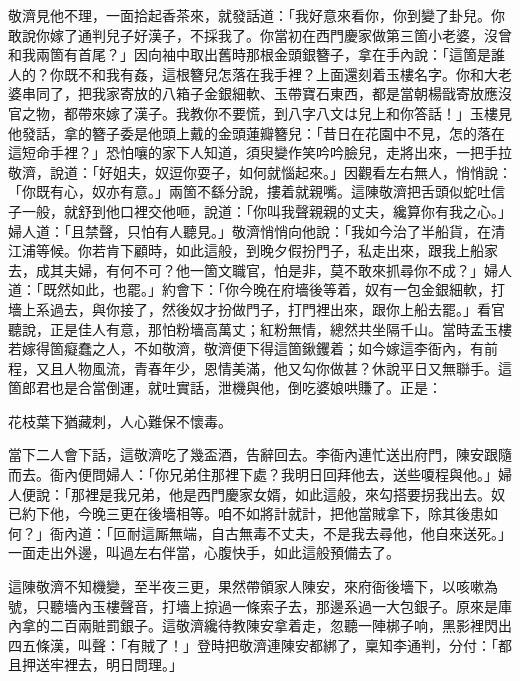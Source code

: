敬濟見他不理，一面拾起香茶來，就發話道：「我好意來看你，你到變了卦兒。你敢說你嫁了通判兒子好漢子，不採我了。你當初在西門慶家做第三箇小老婆，沒曾和我兩箇有首尾？」因向袖中取出舊時那根金頭銀簪子，拿在手內說：「這箇是誰人的？你既不和我有姦，這根簪兒怎落在我手裡？上面還刻着玉樓名字。你和大老婆串同了，把我家寄放的八箱子金銀細軟、玉帶寶石東西，都是當朝楊戩寄放應沒官之物，都帶來嫁了漢子。我教你不要慌，到八字八文は兒上和你答話！」玉樓見他發話，拿的簪子委是他頭上戴的金頭蓮瓣簪兒：「昔日在花園中不見，怎的落在這短命手裡？」恐怕嚷的家下人知道，須臾變作笑吟吟臉兒，走將出來，一把手拉敬濟，說道：「好姐夫，奴逗你耍子，如何就惱起來。」因觀看左右無人，悄悄說：「你既有心，奴亦有意。」{}兩箇不繇分說，摟着就親嘴。這陳敬濟把舌頭似蛇吐信子一般，就舒到他口裡交他咂，說道：「你叫我聲親親的丈夫，纔算你有我之心。」婦人道：「且禁聲，只怕有人聽見。」敬濟悄悄向他說：「我如今治了半船貨，在清江浦等候。你若肯下顧時，如此這般，到晚夕假扮門子，私走出來，跟我上船家去，成其夫婦，有何不可？他一箇文職官，怕是非，莫不敢來抓尋你不成？」{}婦人道：「既然如此，也罷。」約會下：「你今晚在府墻後等着，奴有一包金銀細軟，打墻上系過去，與你接了，然後奴才扮做門子，打門裡出來，跟你上船去罷。」看官聽說，正是佳人有意，那怕粉墻高萬丈；紅粉無情，總然共坐隔千山。當時孟玉樓若嫁得箇癡蠢之人，不如敬濟，敬濟便下得這箇鍬钁着；如今嫁這李衙內，有前程，又且人物風流，青春年少，恩情美滿，他又勾你做甚？休說平日又無聯手。{}{}這箇郎君也是合當倒運，就吐實話，泄機與他，倒吃婆娘哄賺了。正是：

\begin{myquote}
花枝葉下猶藏刺，人心難保不懷毒。
\end{myquote}

當下二人會下話，這敬濟吃了幾盃酒，告辭回去。李衙內連忙送出府門，陳安跟隨而去。衙內便問婦人：「你兄弟住那裡下處？我明日回拜他去，送些嗄程與他。」婦人便說：「那裡是我兄弟，他是西門慶家女婿，如此這般，來勾搭要拐我出去。奴已約下他，今晚三更在後墻相等。咱不如將計就計，把他當賊拿下，除其後患如何？」{}衙內道：「叵耐這厮無端，自古無毒不丈夫，不是我去尋他，他自來送死。」一面走出外邊，叫過左右伴當，心腹快手，如此這般預備去了。

這陳敬濟不知機變，至半夜三更，果然帶領家人陳安，來府衙後墻下，以咳嗽為號，只聽墻內玉樓聲音，打墻上掠過一條索子去，那邊系過一大包銀子。原來是庫內拿的二百兩賍罰銀子。這敬濟纔待教陳安拿着走，忽聽一陣梆子响，黑影裡閃出四五條漢，叫聲：「有賊了！」登時把敬濟連陳安都綁了，稟知李通判，分付：「都且押送牢裡去，明日問理。」

